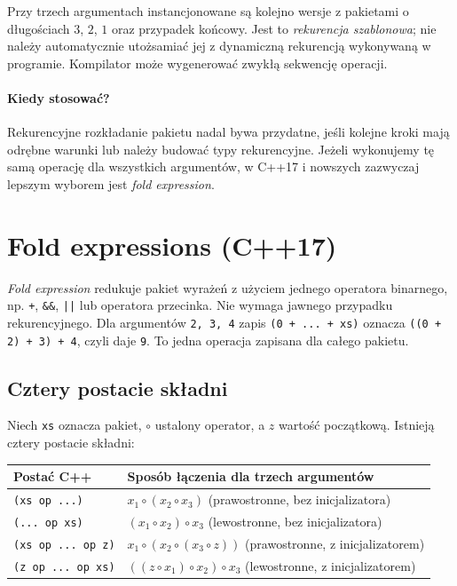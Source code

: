 Przy trzech argumentach instancjonowane są kolejno wersje
z pakietami o długościach $3$, $2$, $1$ oraz przypadek końcowy.
Jest to \emph{rekurencja szablonowa}; nie należy automatycznie
utożsamiać jej z dynamiczną rekurencją wykonywaną w programie.
Kompilator może wygenerować zwykłą sekwencję operacji.

\paragraph{Kiedy stosować?}
Rekurencyjne rozkładanie pakietu nadal bywa przydatne, jeśli kolejne
kroki mają odrębne warunki lub należy budować typy rekurencyjne.
Jeżeli wykonujemy tę samą operację dla wszystkich argumentów,
w C++17 i nowszych zazwyczaj lepszym wyborem jest \emph{fold expression}.

\section{Fold expressions (C++17)}

\label{sec:variadic-fold}

\emph{Fold expression} redukuje pakiet wyrażeń z użyciem jednego
operatora binarnego, np. \texttt{+}, \texttt{\&\&}, \texttt{||}
lub operatora przecinka. Nie wymaga jawnego przypadku
rekurencyjnego. Dla argumentów \texttt{2, 3, 4} zapis
\texttt{(0 + ... + xs)} oznacza \texttt{((0 + 2) + 3) + 4},
czyli daje \texttt{9}. To jedna operacja zapisana dla całego pakietu.

\subsection{Cztery postacie składni}

Niech \texttt{xs} oznacza pakiet, $\circ$ ustalony operator,
a $z$ wartość początkową. Istnieją cztery postacie składni:

\begin{center}
\small
\begin{tabular}{|p{}|p{}|}
\hline
\textbf{Postać C++} & \textbf{Sposób łączenia dla trzech argumentów} \\
\hline
\texttt{(xs op ...)} & $x_1\circ(x_2\circ x_3)$ (prawostronne, bez inicjalizatora) \\
\hline
\texttt{(... op xs)} & $(x_1\circ x_2)\circ x_3$ (lewostronne, bez inicjalizatora) \\
\hline
\texttt{(xs op ... op z)} & $x_1\circ(x_2\circ(x_3\circ z))$ (prawostronne, z inicjalizatorem) \\
\hline
\texttt{(z op ... op xs)} & $((z\circ x_1)\circ x_2)\circ x_3$ (lewostronne, z inicjalizatorem) \\
\hline
\end{tabular}
\end{center}

